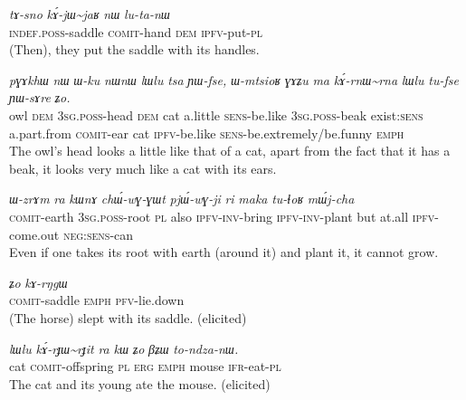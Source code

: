 \documentclass[oldfontcommands,oneside,a4paper,11pt]{article}
\newcommand{\ipa}[1]{{\phon\textit{#1}}} %
\newcommand{\tld}{\textasciitilde{}}
\begin{document}
\begin{exe}
\ex \label{ex:kAjWjaR}
\gll
\ipa{tɤ-sno}  	\ipa{kɤ́-jɯ\tld{}jaʁ}  	\ipa{nɯ}  	\ipa{lu-ta-nɯ}  \\
\textsc{indef.poss}-saddle \textsc{comit}-hand \textsc{dem} \textsc{ipfv}-put-\textsc{pl} \\
\glt (Then), they put the saddle with its handles.
\end{exe}

\begin{exe}
\ex \label{ex:kArnWrna}
\gll
\ipa{pɣɤkhɯ}  	\ipa{nɯ}  	\ipa{ɯ-ku}  	\ipa{nɯnɯ}  	\ipa{lɯlu}  	\ipa{tsa}  	\ipa{ɲɯ-fse,}  	\ipa{ɯ-mtsioʁ}  	\ipa{ɣɤʑu}  	\ipa{ma}  \ipa{kɤ́-rnɯ\tld{}rna}  	\ipa{lɯlu}  	\ipa{tu-fse}  	\ipa{ɲɯ-sɤre}  	\ipa{ʑo.}  \\
owl \textsc{dem} \textsc{3sg.poss}-head \textsc{dem} cat a.little \textsc{sens}-be.like \textsc{3sg.poss}-beak exist:\textsc{sens} a.part.from \textsc{comit}-ear cat \textsc{ipfv}-be.like \textsc{sens}-be.extremely/be.funny \textsc{emph} \\
\glt The owl's head looks a little like that of a cat, apart from the fact that it has a beak, it looks very much like a cat with its ears.
\end{exe}


\begin{exe}
\ex \label{ex:kAthAlwWlwa}
\gll \ipa{kɤ́-thɤlwɯ\tld{}lwa}  	\ipa{ɯ-zrɤm}  	\ipa{ra}  	\ipa{kɯnɤ}  	\ipa{chɯ́-wɣ-ɣɯt}  	\ipa{pjɯ́-wɣ-ji}  	\ipa{ri}  	\ipa{maka}  	\ipa{tu-ɬoʁ}  	\ipa{mɯ́j-cha}  \\
\textsc{comit}-earth \textsc{3sg.poss}-root \textsc{pl} also \textsc{ipfv-inv}-bring \textsc{ipfv-inv}-plant but at.all \textsc{ipfv}-come.out \textsc{neg:sens}-can \\
\glt Even if one takes its root with earth (around it) and plant it, it cannot grow.
\end{exe}


\begin{exe}
\ex \label{ex:kAsnWsno}
\gll \ipa{kɤ́-snɯ\tld{}sno}  	\ipa{ʑo}  	\ipa{kɤ-rŋgɯ}  \\
\textsc{comit}-saddle \textsc{emph} \textsc{pfv}-lie.down \\
\glt (The horse) slept with its saddle. (elicited)
\end{exe}

\begin{exe}
\ex \label{ex:kArJWrJit.kW}
\gll 
\ipa{lɯlu} 	\ipa{kɤ́-rɟɯ\tld{}rɟit} 	\ipa{ra} 	\ipa{kɯ} 	\ipa{ʑo} 	\ipa{βʑɯ} 	\ipa{to-ndza-nɯ.} \\
cat \textsc{comit}-offspring \textsc{pl}  \textsc{erg} \textsc{emph} mouse \textsc{ifr}-eat-\textsc{pl} \\
\glt The cat and its young ate the mouse. (elicited)
\end{exe}
\end{document}

